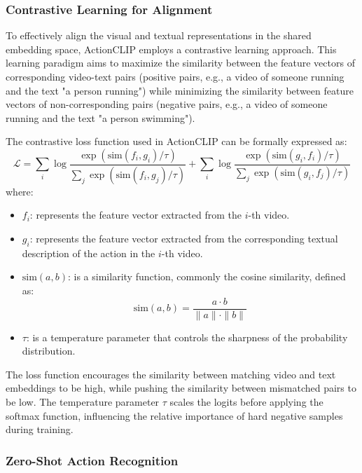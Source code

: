 \subsubsection{Contrastive Learning for Alignment}

To effectively align the visual and textual representations in the shared embedding space, ActionCLIP employs a contrastive learning approach. This learning paradigm aims to maximize the similarity between the feature vectors of corresponding video-text pairs (positive pairs, e.g., a video of someone running and the text "a person running") while minimizing the similarity between feature vectors of non-corresponding pairs (negative pairs, e.g., a video of someone running and the text "a person swimming").

The contrastive loss function used in ActionCLIP can be formally expressed as:
$$
\mathcal{L} = \sum_{i} \log \frac{\exp(\text{sim}(f_i, g_i) / \tau)}{\sum_{j} \exp(\text{sim}(f_i, g_j) / \tau)} + \sum_{i} \log \frac{\exp(\text{sim}(g_i, f_i) / \tau)}{\sum_{j} \exp(\text{sim}(g_i, f_j) / \tau)}
$$
where:
\begin{itemize}
    \item $f_i$: represents the feature vector extracted from the $i$-th video.
    \item $g_i$: represents the feature vector extracted from the corresponding textual description of the action in the $i$-th video.
    \item $\text{sim}(a, b)$: is a similarity function, commonly the cosine similarity, defined as:
    $$
    \text{sim}(a, b) = \frac{a \cdot b}{\|a\| \cdot \|b\|}
    $$
    \item $\tau$: is a temperature parameter that controls the sharpness of the probability distribution.
\end{itemize}
The loss function encourages the similarity between matching video and text embeddings to be high, while pushing the similarity between mismatched pairs to be low. The temperature parameter $\tau$ scales the logits before applying the softmax function, influencing the relative importance of hard negative samples during training.

\subsubsection{Zero-Shot Action Recognition}

